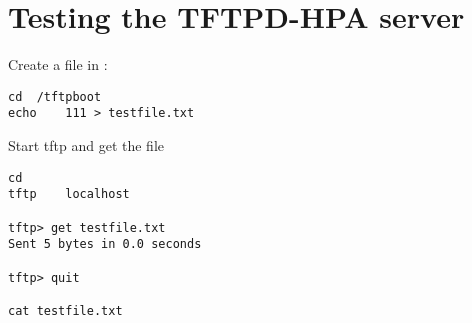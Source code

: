 \clearpage
\section{Testing the TFTPD-HPA server}

Create a file in :

\begin{verbatim}
cd	/tftpboot
echo	111	> testfile.txt
\end{verbatim}

Start tftp and get the file

\begin{verbatim}
cd
tftp	localhost

tftp> get testfile.txt
Sent 5 bytes in 0.0 seconds

tftp> quit

cat testfile.txt

\end{verbatim}


